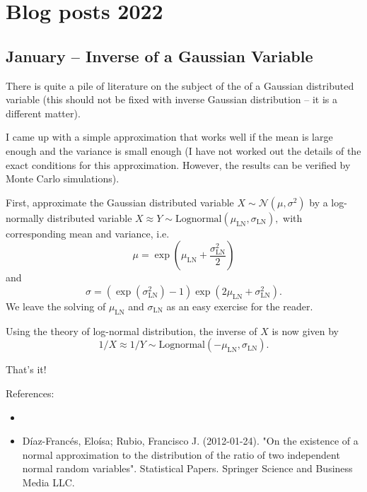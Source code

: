 \documentclass{article}
\begin{document}
\section{Blog posts 2022}


\subsection{January – Inverse of a Gaussian Variable}

There is quite a pile of literature on the subject of the  of a Gaussian distributed variable (this should not be fixed with inverse Gaussian distribution – it is a different matter).

I came up with a simple approximation that works well if the mean is large enough and the variance is small enough (I have not worked out the details of the exact conditions for this approximation. However, the results can be verified by Monte Carlo simulations). 

First, approximate the Gaussian distributed variable $X \sim \mathcal{N}(\mu, \sigma^2)$ by a log-normally distributed variable $X \approx Y \sim \text{Lognormal}(\mu_{\text{LN}}, \sigma_{\text{LN}}),$ with corresponding mean and variance, i.e.
$$\mu = \exp\left( \mu_{\text{LN}} + \frac{\sigma_{\text{LN}}^2}{2} \right)$$ and
$$\sigma = (\exp( \sigma_{\text{LN}}^2) - 1)\exp(2 \mu_{\text{LN}} + \sigma_{\text{LN}}^2).$$ We leave the solving of $\mu_{\text{LN}}$ and $\sigma_{\text{LN}}$ as an easy exercise for the reader.


Using the theory of log-normal distribution, the inverse of $X$ is now given by
$$
1/X \approx 1/Y \sim \text{Lognormal}(-\mu_{\text{LN}}, \sigma_{\text{LN}}).
$$

That's it!


References:
\begin{itemize}
\item {}
\item  Díaz-Francés, Eloísa; Rubio, Francisco J. (2012-01-24). "On the existence of a normal approximation to the distribution of the ratio of two independent normal random variables". Statistical Papers. Springer Science and Business Media LLC.
\end{itemize}




\end{document}
